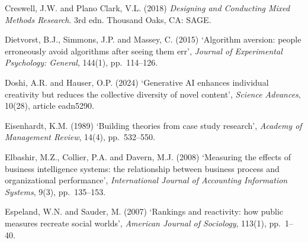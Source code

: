 \documentclass[11pt,a4paper]{article}
\numberwithin{figure}{section}
\numberwithin{table}{section}
\begin{document}
{\noindent\hypertarget{ref19}{}\begin{minipage}[t]{\dimexpr\linewidth-1.05cm\relax}Creswell, J.W. and Plano Clark, V.L. (2018) \emph{Designing and Conducting Mixed Methods Research}. 3rd edn. Thousand Oaks, CA: SAGE.\end{minipage}\par\vspace{4pt}
\noindent\hypertarget{ref20}{}\begin{minipage}[t]{\dimexpr\linewidth-1.05cm\relax}Dietvorst, B.J., Simmons, J.P. and Massey, C. (2015) `Algorithm aversion: people erroneously avoid algorithms after seeing them err', \emph{Journal of Experimental Psychology: General}, 144(1), pp.~114--126.\end{minipage}\par\vspace{4pt}
\noindent\hypertarget{ref21}{}\begin{minipage}[t]{\dimexpr\linewidth-1.05cm\relax}Doshi, A.R. and Hauser, O.P. (2024) `Generative AI enhances individual creativity but reduces the collective diversity of novel content', \emph{Science Advances}, 10(28), article eadn5290.\end{minipage}\par\vspace{4pt}
\noindent\hypertarget{ref22}{}\begin{minipage}[t]{\dimexpr\linewidth-1.05cm\relax}Eisenhardt, K.M. (1989) `Building theories from case study research', \emph{Academy of Management Review}, 14(4), pp.~532--550.\end{minipage}\par\vspace{4pt}
\noindent\hypertarget{ref23}{}\begin{minipage}[t]{\dimexpr\linewidth-1.05cm\relax}Elbashir, M.Z., Collier, P.A. and Davern, M.J. (2008) `Measuring the effects of business intelligence systems: the relationship between business process and organizational performance', \emph{International Journal of Accounting Information Systems}, 9(3), pp.~135--153.\end{minipage}\par\vspace{4pt}
\noindent\hypertarget{ref24}{}\begin{minipage}[t]{\dimexpr\linewidth-1.05cm\relax}Espeland, W.N. and Sauder, M. (2007) `Rankings and reactivity: how public measures recreate social worlds', \emph{American Journal of Sociology}, 113(1), pp.~1--40.\end{minipage}\par\vspace{4pt}
}
\end{document}
